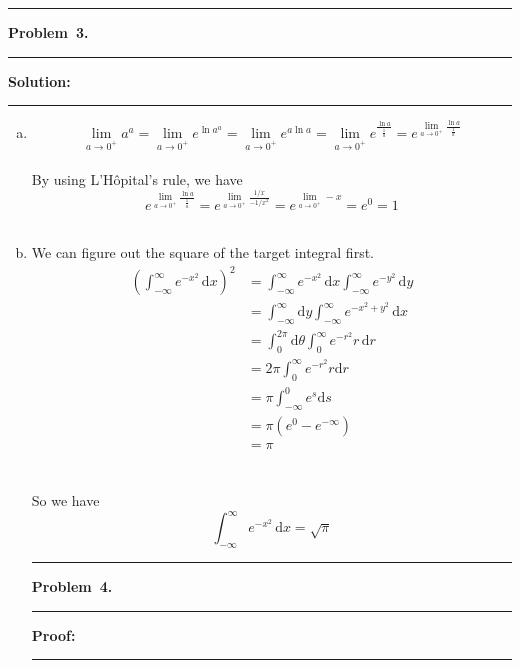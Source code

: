 \documentclass[10.5pt]{article}
\newcommand\question[1]{\vspace{.2in}\hrule\vspace{0.04in}\textbf{Problem\ #1.}\vspace{.4em}\hrule\vspace{.10in}}
\newcommand\Solution{\vspace{.3in}\textbf{Solution:}\vspace{.5em}\hrule\vspace{.08in}\par}
\newcommand\Proof{\vspace{.3in}\textbf{Proof:}\vspace{.5em}\hrule\vspace{.08in}\par}
\begin{document}
	\question{3}

	\Solution{}

\begin{enumerate}[(a)]
	\item 
	\begin{equation*}
			\lim_{a \to 0^+} a^a = \lim_{a \to 0^+} e^{\ln a^a}=\lim_{a \to 0^+} e^{a\ln a} = \lim_{a \to 0^+} e^{\frac{\ln a}{\frac{1}{a}}} = e^{{\lim\limits_{a \to 0^+}}\frac{\ln a}{\frac{1}{a}}}
	\end{equation*}
\ \\

By using L'Hôpital's rule, we have
\ \\

\begin{equation*}
	e^{{\lim\limits_{a \to 0^+}}\frac{\ln a}{\frac{1}{a}}} = e^{{\lim\limits_{a \to 0^+}}\frac{1/x}{-1/x^2}} = e^{\lim\limits_{a \to 0^+} -x} = e^0 = 1
\end{equation*}\\[8pt]

	\item 
	
	We can figure out the square of the target integral first.
	\begin{align*}
		\left(\int_{-\infty}^{\infty}  e^{-x^2}\,\mathrm{d}x\right)^2
		&=	\int_{-\infty}^{\infty}  e^{-x^2}\,\mathrm{d}x \int_{-\infty}^{\infty}  e^{-y^2}\,\mathrm{d}y\\[6pt]
		&= \int_{-\infty}^{\infty}\mathrm{d}y\int_{-\infty}^{\infty}  e^{-x^2+y^2}\,\mathrm{d}x\\[6pt]
		&= \int_{0}^{2\pi}\mathrm{d}\theta\int_{0}^{\infty}  e^{-r^2}r\,\mathrm{d}r\\[6pt]
		&= 2\pi\int_{0}^{\infty}e^{-r^2}r\mathrm{d}r\\[6pt]
		&= \pi\int_{-\infty}^{0}e^{s}\mathrm{d}s\\[6pt]
		&= \pi(e^0 - e^{-\infty})\\[6pt]
		&=\pi
	\end{align*}\\[8pt]
	\ \\
	So we have$$\int_{-\infty}^{\infty}  e^{-x^2}\,\mathrm{d}x = \sqrt{\pi}$$

\pagebreak

	\question{4}

	\Proof{}


\end{enumerate}
\end{document}
